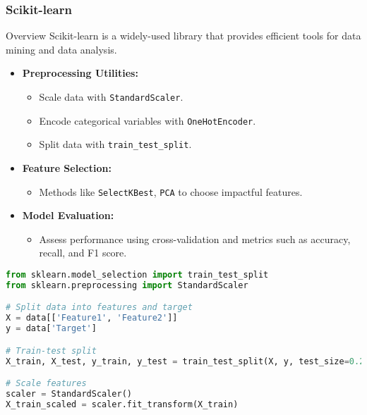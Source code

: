 \documentclass[aspectratio=169]{beamer}
\begin{document}
\begin{frame}[fragile]
    \frametitle{Scikit-learn}
    \begin{block}{Overview}
        Scikit-learn is a widely-used library that provides efficient tools for data mining and data analysis.
    \end{block}
    
    \begin{itemize}
        \item \textbf{Preprocessing Utilities:}
            \begin{itemize}
                \item Scale data with \texttt{StandardScaler}.
                \item Encode categorical variables with \texttt{OneHotEncoder}.
                \item Split data with \texttt{train\_test\_split}.
            \end{itemize}
        \item \textbf{Feature Selection:}
            \begin{itemize}
                \item Methods like \texttt{SelectKBest}, \texttt{PCA} to choose impactful features.
            \end{itemize}
        \item \textbf{Model Evaluation:}
            \begin{itemize}
                \item Assess performance using cross-validation and metrics such as accuracy, recall, and F1 score.
            \end{itemize}
    \end{itemize}
    
    \begin{lstlisting}[language=Python]
from sklearn.model_selection import train_test_split
from sklearn.preprocessing import StandardScaler

# Split data into features and target
X = data[['Feature1', 'Feature2']]
y = data['Target']

# Train-test split
X_train, X_test, y_train, y_test = train_test_split(X, y, test_size=0.2, random_state=42)

# Scale features
scaler = StandardScaler()
X_train_scaled = scaler.fit_transform(X_train)
    \end{lstlisting}
\end{frame}
\end{document}
